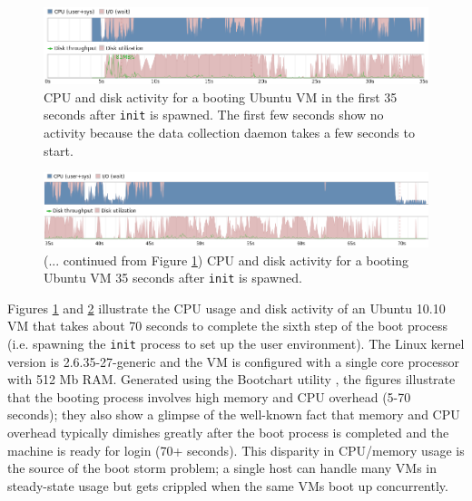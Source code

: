 \begin{figure}[h]
  \centering
  \includegraphics[scale=0.64, trim=1cm 0cm 1cm 0cm]{boot_first35seconds.png}
  \caption[CPU and disk activity for a booting Ubuntu VM in the first 35
  seconds after \texttt{init} is spawned]%
  {CPU and disk activity for a booting Ubuntu VM in the first 35 seconds after \texttt{init} is spawned.
  The first few seconds show no activity because
  the data collection daemon takes a few seconds to start.}
  \label{boot:first35}
\end{figure}

\begin{figure}[h]
  \center
  \includegraphics[scale=0.6, trim=1cm 0cm 1cm 0cm]{boot_last35seconds.png}
  \caption[(... continued) CPU and disk activity for a booting VM
  35 seconds after \texttt{init} is spawned. ]%
  {(... continued from Figure \ref{boot:first35}) CPU and disk activity for a booting Ubuntu VM 35 seconds after \texttt{init} is spawned.}
  \label{boot:last35}
\end{figure}

Figures \ref{boot:first35} and \ref{boot:last35}
illustrate the CPU usage and disk activity 
of an Ubuntu 10.10 VM that takes about 70 seconds
to complete the sixth step of the boot process (i.e. spawning 
the \texttt{init} process to set up the user environment).
The Linux kernel version is 2.6.35-27-generic
and the VM is configured with a single core processor
with 512 Mb RAM. Generated using
the Bootchart utility \cite{mahkovec2005bootchart},
the figures illustrate that
the booting process involves high memory
and CPU overhead (5-70 seconds); they also 
show a glimpse of the well-known fact that memory and CPU
overhead typically dimishes greatly after the boot
process is completed and the machine is
ready for login (70+ seconds). This disparity
in CPU/memory usage is the source of the boot storm problem;
a single host can handle many VMs in
steady-state usage but gets crippled
when the same VMs boot up concurrently.

